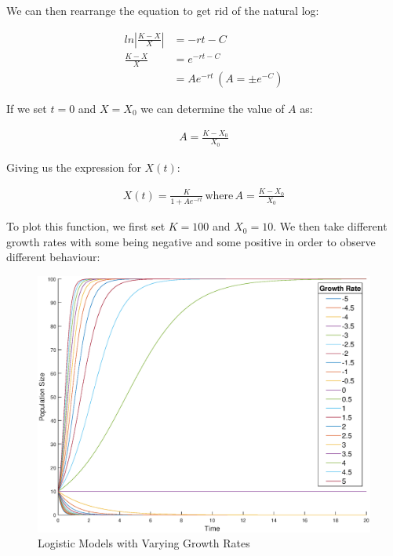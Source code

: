 \documentclass[]{report}
\begin{document}
	We can then rearrange the equation to get rid of the natural log:
	
	\begin{align}
		ln\left|\frac{K - X}{X}\right| &= -rt - C \\
		\frac{K - X}{X} &= e^{-rt - C} \\
		&= Ae^{-rt} \hspace{2pt} (A = \pm e^{-C})
	\end{align}
	
	If we set $t = 0$ and $X = X_0$ we can determine the value of $A$ as:
	
	\begin{align}
		A = \frac{K - X_0}{X_0}
	\end{align}

	Giving us the expression for $X(t)$:
	
	\begin{align}
		X(t) = \frac{K}{1 + Ae^{-rt}} \hspace{2pt} \text{where} \hspace{2pt} A = \frac{K - X_0}{X_0}
	\end{align}

	To plot this function, we first set $K = 100$ and $X_0 = 10$. We then take different growth rates with some being negative and some positive 
	in order to observe different behaviour:
	
	\begin{figure}[h]
		\centering
		\includegraphics[scale = 0.35]{logistic_model.eps}
		\caption{Logistic Models with Varying Growth Rates}
	\end{figure}
\end{document}
